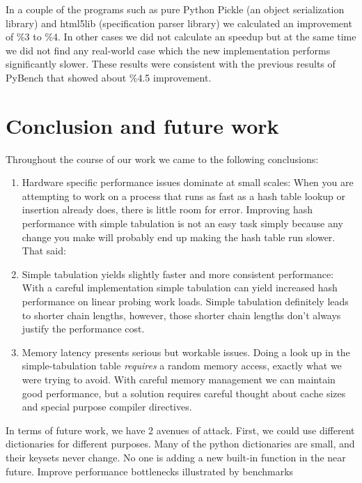 \documentclass[11pt]{article}
\begin{document}
In a couple of the programs such as pure Python Pickle (an object serialization library) and html5lib (specification parser library) we calculated an improvement of \%3 to \%4. In other cases we did not calculate an speedup but at the same time we did not find any real-world case which the new implementation performs significantly slower. These results were consistent with the previous results of PyBench that showed about \%4.5 improvement.
 
\section{Conclusion and future work}
Throughout the course of our work we came to the following conclusions:
\begin{enumerate}
\item Hardware specific performance issues dominate at small scales: When you are attempting to work on a process that runs as fast as a hash table lookup or insertion already does, there is little room for error.  Improving hash performance with simple tabulation is not an easy task simply because any change you make will probably end up making the hash table run slower.  That said:

\item Simple tabulation yields slightly faster and more consistent performance: With a careful implementation simple tabulation can yield increased hash performance on linear probing work loads. Simple tabulation definitely leads to shorter chain lengths, however, those shorter chain lengths don’t always justify the performance cost.

\item Memory latency presents serious but workable issues.  Doing a look up in the simple-tabulation table \emph{requires} a random memory access, exactly what we were trying to avoid. With careful memory management we can maintain good performance, but a solution requires careful thought about cache sizes and special purpose compiler directives.

\end{enumerate}

In terms of future work, we have 2 avenues of attack. First, we could use different dictionaries for different purposes. Many of the python dictionaries are small, and their keysets never change. No one is adding a new built-in function in the near future. 
Improve performance bottlenecks illustrated by benchmarks
\end{document}
